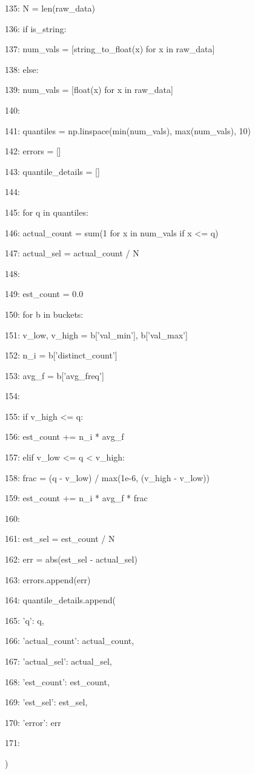 \documentclass[11pt,a4paper]{article}
\begin{document}
135:     N = len(raw\_data)

136:     if is\_string:

137:         num\_vals = [string\_to\_float(x) for x in raw\_data]

138:     else:

139:         num\_vals = [float(x) for x in raw\_data]

140:

141:     quantiles = np.linspace(min(num\_vals), max(num\_vals), 10)

142:     errors = []

143:     quantile\_details = []

144:

145:     for q in quantiles:

146:         actual\_count = sum(1 for x in num\_vals if x <= q)

147:         actual\_sel = actual\_count / N

148:

149:         est\_count = 0.0

150:         for b in buckets:

151:             v\_low, v\_high = b['val\_min'], b['val\_max']

152:             n\_i = b['distinct\_count']

153:             avg\_f = b['avg\_freq']

154:

155:             if v\_high <= q:

156:                 est\_count += n\_i * avg\_f

157:             elif v\_low <= q < v\_high:

158:                 frac = (q - v\_low) / max(1e-6, (v\_high - v\_low))

159:                 est\_count += n\_i * avg\_f * frac

160:

161:         est\_sel = est\_count / N

162:         err = abs(est\_sel - actual\_sel)

163:         errors.append(err)

164:         quantile\_details.append({

165:             'q': q,

166:             'actual\_count': actual\_count,

167:             'actual\_sel': actual\_sel,

168:             'est\_count': est\_count,

169:             'est\_sel': est\_sel,

170:             'error': err

171:         })
\end{document}
